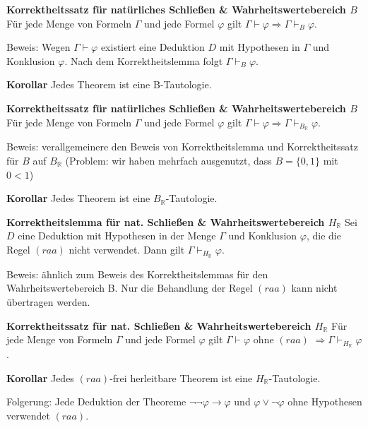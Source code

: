 \documentclass[a4paper]{article}
\renewcommand{\note}[2]{\begin{noteBox} \textbf{#1} #2 \end{noteBox}}
\begin{document}
\begin{multicols}{3}
  \note{Korrektheitssatz für natürliches Schließen \& Wahrheitswertebereich $B$}{Für jede Menge von Formeln $\Gamma$ und jede Formel $\varphi$ gilt $\Gamma\vdash\varphi\Rightarrow\Gamma\vdash_B\varphi$.}

  Beweis: Wegen $\Gamma\vdash\varphi$ existiert eine Deduktion $D$ mit Hypothesen in $\Gamma$ und Konklusion $\varphi$. Nach dem Korrektheitslemma folgt $\Gamma\vdash_B \varphi$.

  \note{Korollar}{Jedes Theorem ist eine B-Tautologie.}
  \note{Korrektheitssatz für natürliches Schließen \& Wahrheitswertebereich $B$}{Für jede Menge von Formeln $\Gamma$ und jede Formel $\varphi$ gilt  $\Gamma\vdash\varphi\Rightarrow\Gamma\vdash_{B_\mathbb{R}}\varphi$.}

  Beweis: verallgemeinere den Beweis von Korrektheitslemma und Korrektheitssatz für $B$ auf $B_\mathbb{R}$ (Problem: wir haben mehrfach ausgenutzt, dass $B=\{0,1\}$ mit $0<1$)

  \note{Korollar}{Jedes Theorem ist eine $B_\mathbb{R}$-Tautologie.}

  \note{Korrektheitslemma für nat. Schließen \& Wahrheitswertebereich  $H_{\mathbb{R}}$ }{Sei $D$ eine Deduktion mit Hypothesen in der Menge $\Gamma$ und Konklusion $\varphi$, die die Regel $(raa)$ nicht verwendet. Dann gilt $\Gamma\vdash_{H_\mathbb{R}}\varphi$.}

  Beweis: ähnlich zum Beweis des Korrektheitslemmas für den Wahrheitswertebereich B. Nur die Behandlung der Regel $(raa)$ kann nicht übertragen werden.

  \note{Korrektheitssatz für nat. Schließen \& Wahrheitswertebereich $H_{\mathbb{R}}$ }{Für jede Menge von Formeln $\Gamma$ und jede Formel $\varphi$ gilt $\Gamma\vdash\varphi$ ohne $(raa)$ $\Rightarrow\Gamma\vdash_{H_{\mathbb{R}}}\varphi$.}

  \note{Korollar}{Jedes $(raa)$-frei herleitbare Theorem ist eine $H_{\mathbb{R}}$-Tautologie.}

  Folgerung: Jede Deduktion der Theoreme $\lnot\lnot\varphi\rightarrow\varphi$ und $\varphi\vee\lnot\varphi$ ohne Hypothesen verwendet $(raa)$.


\end{multicols}
\end{document}
